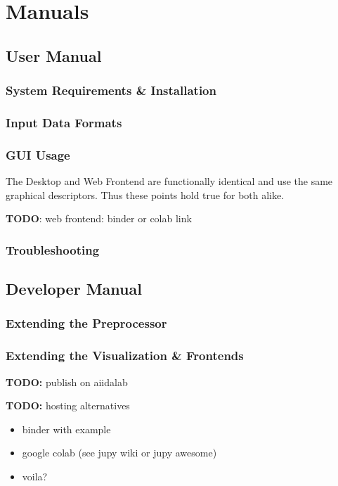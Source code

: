 
\chapter{Manuals}
\label{cha:manuals}

\section{User Manual}
\label{sec:user-manual}

\subsection{System Requirements \& Installation}
\label{sec:system-requirements}

\subsection{Input Data Formats}
\label{sec:input-data-formats}

\subsection{GUI Usage}
\label{sec:gui-usage}

The Desktop and Web Frontend are functionally identical and use the same
graphical descriptors. Thus these points hold true for both alike.

\textbf{TODO}: web frontend: binder or colab link

\subsection{Troubleshooting}
\label{sec:troubleshooting}


\section{Developer Manual}
\label{sec:developer-manual}

\subsection{Extending the Preprocessor}
\label{sec:extend-prepr}

\subsection{Extending the Visualization \& Frontends}
\label{sec:extend-visu-}

\textbf{TODO:} publish on aiidalab 

\textbf{TODO:} hosting alternatives
\begin{itemize}
\item binder with example
\item google colab (see jupy wiki or jupy awesome) \cite{jupyter-awesome}
\item voila?
\end{itemize}







